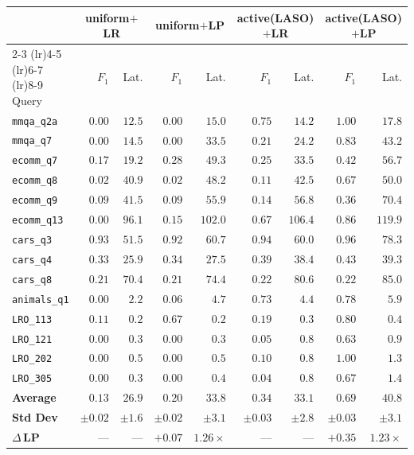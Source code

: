 \begin{tabular}{@{}l rr rr rr rr@{}}
\toprule
& \multicolumn{2}{c}{uniform$+$LR} & \multicolumn{2}{c}{uniform$+$LP} & \multicolumn{2}{c}{active(LASO)$+$LR} & \multicolumn{2}{c}{active(LASO)$+$LP} \\
\cmidrule(lr){2-3} \cmidrule(lr){4-5} \cmidrule(lr){6-7} \cmidrule(lr){8-9}
Query & $F_1$ & Lat. & $F_1$ & Lat. & $F_1$ & Lat. & $F_1$ & Lat. \\
\midrule
\texttt{mmqa\_q2a}   & $0.00$ & $12.5$ & $0.00$ & $15.0$ & $0.75$ & $14.2$ & $\mathbf{1.00}$ & $17.8$ \\
\texttt{mmqa\_q7}    & $0.00$ & $14.5$ & $0.00$ & $33.5$ & $0.21$ & $24.2$ & $\mathbf{0.83}$ & $43.2$ \\
\texttt{ecomm\_q7}   & $0.17$ & $19.2$ & $0.28$ & $49.3$ & $0.25$ & $33.5$ & $\mathbf{0.42}$ & $56.7$ \\
\texttt{ecomm\_q8}   & $0.02$ & $40.9$ & $0.02$ & $48.2$ & $0.11$ & $42.5$ & $\mathbf{0.67}$ & $50.0$ \\
\texttt{ecomm\_q9}   & $0.09$ & $41.5$ & $0.09$ & $55.9$ & $0.14$ & $56.8$ & $\mathbf{0.36}$ & $70.4$ \\
\texttt{ecomm\_q13}  & $0.00$ & $96.1$ & $0.15$ & $102.0$ & $0.67$ & $106.4$ & $\mathbf{0.86}$ & $119.9$ \\
\texttt{cars\_q3}    & $0.93$ & $51.5$ & $0.92$ & $60.7$ & $0.94$ & $60.0$ & $\mathbf{0.96}$ & $78.3$ \\
\texttt{cars\_q4}    & $0.33$ & $25.9$ & $0.34$ & $27.5$ & $0.39$ & $38.4$ & $\mathbf{0.43}$ & $39.3$ \\
\texttt{cars\_q8}    & $0.21$ & $70.4$ & $0.21$ & $74.4$ & $0.22$ & $80.6$ & $\mathbf{0.22}$ & $85.0$ \\
\texttt{animals\_q1} & $0.00$ & $2.2$ & $0.06$ & $4.7$ & $0.73$ & $4.4$ & $\mathbf{0.78}$ & $5.9$ \\
\texttt{LRO\_113}    & $0.11$ & $0.2$ & $0.67$ & $0.2$ & $0.19$ & $0.3$ & $\mathbf{0.80}$ & $0.4$ \\
\texttt{LRO\_121}    & $0.00$ & $0.3$ & $0.00$ & $0.3$ & $0.05$ & $0.8$ & $\mathbf{0.63}$ & $0.9$ \\
\texttt{LRO\_202}    & $0.00$ & $0.5$ & $0.00$ & $0.5$ & $0.10$ & $0.8$ & $\mathbf{1.00}$ & $1.3$ \\
\texttt{LRO\_305}    & $0.00$ & $0.3$ & $0.00$ & $0.4$ & $0.04$ & $0.8$ & $\mathbf{0.67}$ & $1.4$ \\
\midrule
\textbf{Average}      & $0.13$ & $26.9$ & $0.20$ & $33.8$ & $0.34$ & $33.1$ & $\mathbf{0.69}$ & $40.8$ \\
\textbf{Std Dev}      & $\pm0.02$ & $\pm1.6$ & $\pm0.02$ & $\pm3.1$ & $\pm0.03$ & $\pm2.8$ & $\pm0.03$ & $\pm3.1$ \\
\midrule
\textbf{$\Delta$\,LP} & --- & --- & $+0.07$ & $1.26\times$ & --- & --- & $+0.35$ & $1.23\times$ \\
\bottomrule
\end{tabular}
